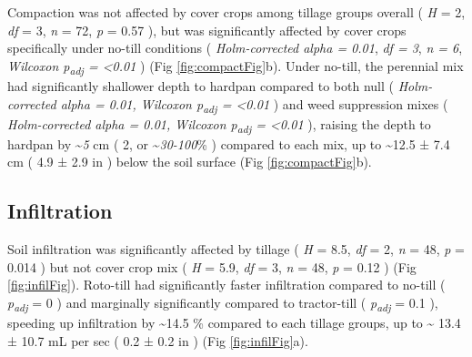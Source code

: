 \documentclass[
  12pt,
]{article}
\begin{document}
Compaction was not affected by cover crops among tillage groups overall (
\emph{H} = 2,
\emph{df} = 3,
\emph{n} = 72,
\emph{p} = 0.57
), but was significantly affected by cover crops specifically under no-till conditions (
\emph{Holm-corrected alpha = 0.01},
\emph{df = 3},
\emph{n = 6},
\emph{Wilcoxon p\textsubscript{adj} = \textless0.01}
) (Fig \ref{fig:compactFig}b).
Under no-till, the perennial mix had significantly shallower depth to hardpan compared to both null (
\emph{Holm-corrected alpha = 0.01, Wilcoxon p\textsubscript{adj} = \textless0.01}
) and weed suppression mixes (
\emph{Holm-corrected alpha = 0.01, Wilcoxon p\textsubscript{adj} = \textless0.01}
),
raising the depth to hardpan by
\textasciitilde{}\emph{5} cm (
2, or
\textasciitilde{}\emph{30-100}\%
) compared to each mix,
up to
\textasciitilde12.5 ±
7.4 cm
(
4.9 ±
2.9 in
) below the soil surface
(Fig \ref{fig:compactFig}b).

\hypertarget{infiltration}{%
\subsection{Infiltration}\label{infiltration}}

Soil infiltration was significantly affected by tillage (
\emph{H} = 8.5,
\emph{df} = 2,
\emph{n} = 48,
\emph{p} = 0.014
) but not cover crop mix (
\emph{H} = 5.9,
\emph{df} = 3,
\emph{n} = 48,
\emph{p} = 0.12
) (Fig \ref{fig:infilFig}).
Roto-till had significantly faster infiltration compared to no-till (
\emph{p\textsubscript{adj}} = 0
) and marginally significantly compared to tractor-till (
\emph{p\textsubscript{adj}} = 0.1
), speeding up infiltration by
\textasciitilde14.5 \%
compared to each tillage groups,
up to
\textasciitilde{} 13.4 ±
10.7 mL per sec
(
0.2 ±
0.2 in
)
(Fig \ref{fig:infilFig}a).
\end{document}

